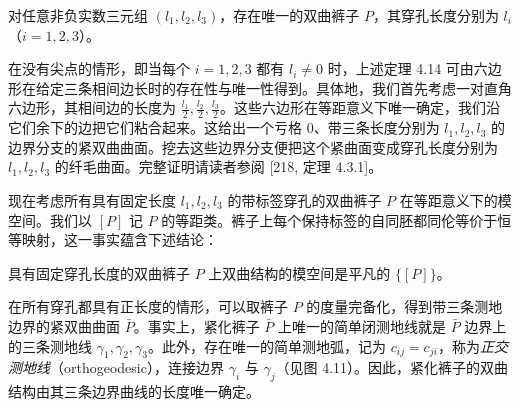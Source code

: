 


\begin{theorem}[4.14]
对任意非负实数三元组 $(l_1,l_2,l_3)$，存在唯一的双曲裤子 $P$，其穿孔长度分别为 $l_i$（$i=1,2,3$）。
\end{theorem}

在没有尖点的情形，即当每个 $i=1,2,3$ 都有 $l_i\ne 0$ 时，上述定理 4.14 可由六边形在给定三条相间边长时的存在性与唯一性得到。具体地，我们首先考虑一对直角六边形，其相间边的长度为 $\frac{l_1}{2},\frac{l_2}{2},\frac{l_3}{2}$。这些六边形在等距意义下唯一确定，我们沿它们余下的边把它们粘合起来。这给出一个亏格 $0$、带三条长度分别为 $l_1,l_2,l_3$ 的边界分支的紧双曲曲面。挖去这些边界分支便把这个紧曲面变成穿孔长度分别为 $l_1,l_2,l_3$ 的纤毛曲面。完整证明请读者参阅 [218, 定理 4.3.1]。

现在考虑所有具有固定长度 $l_1,l_2,l_3$ 的带标签穿孔的双曲裤子 $P$ 在等距意义下的模空间。我们以 $[P]$ 记 $P$ 的等距类。裤子上每个保持标签的自同胚都同伦等价于恒等映射，这一事实蕴含下述结论：

\begin{corollary}[4.15]
具有固定穿孔长度的双曲裤子 $P$ 上双曲结构的模空间是平凡的 $\{[P]\}$。
\end{corollary}

在所有穿孔都具有正长度的情形，可以取裤子 $P$ 的度量完备化，得到带三条测地边界的紧双曲曲面 $\bar P$。事实上，紧化裤子 $\bar P$ 上唯一的简单闭测地线就是 $\bar P$ 边界上的三条测地线 $\gamma_1,\gamma_2,\gamma_3$。此外，存在唯一的简单测地弧，记为 $c_{ij}=c_{ji}$，称为\emph{正交测地线}（orthogeodesic），连接边界 $\gamma_i$ 与 $\gamma_j$（见图 4.11）。因此，紧化裤子的双曲结构由其三条边界曲线的长度唯一确定。



